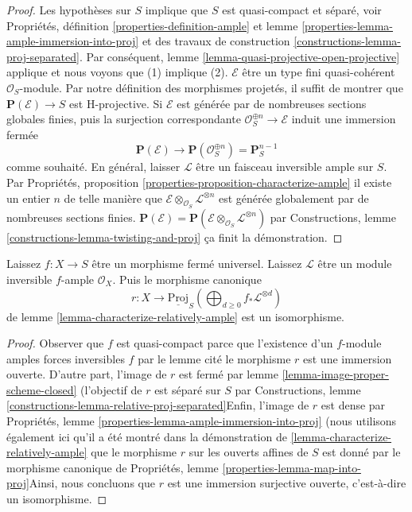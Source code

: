 \begin{proof}

Les hypothèses sur $S$ implique que $S$ est quasi-compact et séparé, voir Propriétés, définition \ref{properties-definition-ample} et lemme \ref{properties-lemma-ample-immersion-into-proj}
et des travaux de construction \ref{constructions-lemma-proj-separated}. Par conséquent, lemme \ref{lemma-quasi-projective-open-projective}
applique et nous voyons que (1) implique (2). $\mathcal{E}$ être un type fini quasi-cohérent $\mathcal{O}_S$-module. Par notre définition des morphismes projetés, il suffit de montrer que
$\mathbf{P}(\mathcal{E}) \to S$ est H-projective. Si $\mathcal{E}$ est générée par de nombreuses sections globales finies, puis la surjection correspondante $\mathcal{O}_S^{\oplus n} \to \mathcal{E}$
induit une immersion fermée
$$
\mathbf{P}(\mathcal{E}) \longrightarrow
\mathbf{P}(\mathcal{O}_S^{\oplus n}) = \mathbf{P}^{n - 1}_S
$$
comme souhaité. En général, laisser $\mathcal{L}$ être un faisceau inversible ample sur $S$. Par Propriétés, proposition \ref{properties-proposition-characterize-ample}
il existe un entier $n$ de telle manière que
$\mathcal{E} \otimes_{\mathcal{O}_S} \mathcal{L}^{\otimes n}$
est générée globalement par de nombreuses sections finies.
$\mathbf{P}(\mathcal{E}) =
\mathbf{P}(\mathcal{E} \otimes_{\mathcal{O}_S} \mathcal{L}^{\otimes n})$ par Constructions, lemme \ref{constructions-lemma-twisting-and-proj}
ça finit la démonstration.

\end{proof}

\begin{lemma}

\label{lemma-proper-ample-is-proj}
Laissez $f : X \to S$ être un morphisme fermé universel. Laissez $\mathcal{L}$ être un module inversible $f$-ample $\mathcal{O}_X$. Puis le morphisme canonique $$
r : X
\longrightarrow
\underline{\text{Proj}}_S
\left(
\bigoplus\nolimits_{d \geq 0} f_*\mathcal{L}^{\otimes d}
\right)
$$ de lemme \ref{lemma-characterize-relatively-ample} est un isomorphisme.
\end{lemma}

\begin{proof}

Observer que $f$ est quasi-compact parce que l'existence d'un $f$-module amples forces inversibles $f$ par le lemme cité le morphisme $r$ est une immersion ouverte. D'autre part, l'image de $r$ est fermé par lemme \ref{lemma-image-proper-scheme-closed}
(l'objectif de $r$ est séparé sur $S$ par Constructions, lemme \ref{constructions-lemma-relative-proj-separated}Enfin, l'image de $r$ est dense par Propriétés, lemme \ref{properties-lemma-ample-immersion-into-proj}
(nous utilisons également ici qu'il a été montré dans la démonstration de \ref{lemma-characterize-relatively-ample}
que le morphisme $r$ sur les ouverts affines de $S$
est donné par le morphisme canonique de Propriétés, lemme \ref{properties-lemma-map-into-proj}Ainsi, nous concluons que $r$ est une immersion surjective ouverte, c'est-à-dire un isomorphisme.

\end{proof}

